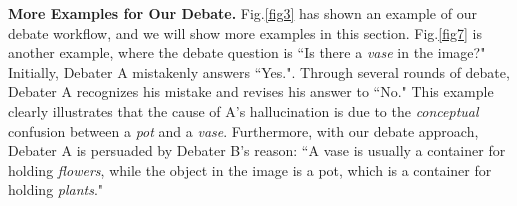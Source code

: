 \documentclass[10pt,twocolumn,letterpaper]{article}
\begin{document}
\begin{table}[htbp]
\begin{center}
\renewcommand\arraystretch{1.2}
\caption{Comparison on hallucination mitigation among the \emph{Baseline}, the \emph{SRO} and \emph{Our approach} with our revised POPE-R dataset.}
\label{tab:t2} %
\end{center}
\vspace{-1.0em}
\end{table}

\noindent\textbf{More Examples for Our Debate.} 
Fig.\ref{fig3} has shown an example of our debate workflow, and we will show more examples in this section. Fig.\ref{fig7} is another example, where the debate question is ``Is there a \emph{vase} in the image?" Initially, Debater A mistakenly answers ``Yes.". Through several rounds of debate, Debater A recognizes his mistake and revises his answer to ``No." This example clearly illustrates that the cause of A's hallucination is due to the \emph{conceptual} confusion between a \emph{pot} and a \emph{vase}. Furthermore, with our debate approach, Debater A is persuaded by Debater B's reason: ``A vase is usually a container for holding \emph{flowers}, while the object in the image is a pot, which is a container for holding \emph{plants}."
\end{document}
